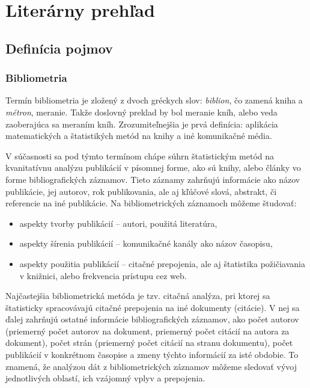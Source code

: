 \chapter{Literárny prehľad}
\setcounter{page}{1}

\section{Definícia pojmov}

\subsection{Bibliometria}

Termín bibliometria je zložený z dvoch gréckych slov: \emph{biblion}, čo zamená
kniha a \emph{métron}, meranie.  Takže doslovný preklad by bol meranie kníh,
alebo veda zaoberajúca sa meraním kníh.  Zrozumiteľnejšia je prvá definícia:
aplikácia matematických a štatistikých metód na knihy a iné komunikačné média.
\citep{Pritchard1969}

V súčasnosti sa pod týmto termínom chápe súhrn štatistickým metód na
kvanitatívnu analýzu publikácií v písomnej forme, ako sú knihy, alebo články vo
forme bibliografických záznamov.  Tieto záznamy zahrňujú informácie ako názov
publikácie, jej autorov, rok publikovania, ale aj kľúčové slová, abstrakt, či
referencie na iné publikácie.  Na bibliometrických záznamoch môžeme študovať:

\begin{itemize}
\item aspekty tvorby publikácií -- autori, použitá literatúra,
\item aspekty šírenia publikácií -- komunikačné kanály ako názov časopisu,
\item aspekty použitia publikácií -- citačné prepojenia, ale aj štatistika
  požičiavania v knižnici, alebo frekvencia prístupu cez web.  \citep{Ondrisova2011}
\end{itemize}

Najčastejšia bibliometrická metóda je tzv.  citačná analýza, pri ktorej sa
štatisticky spracovávajú citačné prepojenia na iné dokumenty (citácie).  V nej
sa ďalej zahrňujú ostatné informácie bibliografických záznamov, ako počet
autorov (priemerný počet autorov na dokument, priemerný počet citácií na autora
za dokument), počet strán (priemerný počet citácií na stranu dokumentu), počet
publikácií v konkrétnom časopise a zmeny týchto informácií za isté obdobie.  To
znamená, že analýzou dát z bibliometrických záznamov môžeme sledovať vývoj
jednotlivých oblastí, ich vzájomný vplyv a prepojenia.

